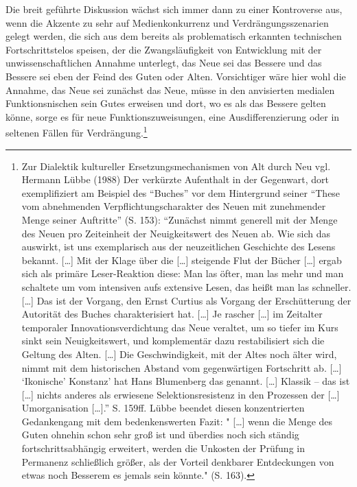 \documentclass[a4paper,
fontsize=11pt,
oneside,
numbers=noperiodatend,
parskip=half-,
bibliography=totoc,
final
]{scrartcl}
\begin{document}
Die breit geführte Diskussion wächst sich immer dann zu einer
Kontroverse aus, wenn die Akzente zu sehr auf Medienkonkurrenz und
Verdrängungsszenarien gelegt werden, die sich aus dem bereits als
problematisch erkannten technischen Fortschrittstelos speisen, der die
Zwangsläufigkeit von Entwicklung mit der unwissenschaftlichen Annahme
unterlegt, das Neue sei das Bessere und das Bessere sei eben der Feind
des Guten oder Alten. Vorsichtiger wäre hier wohl die Annahme, das Neue
sei zunächst das Neue, müsse in den anvisierten medialen
Funktionsnischen sein Gutes erweisen und dort, wo es als das Bessere
gelten könne, sorge es für neue Funktionszuweisungen, eine
Ausdifferenzierung oder in seltenen Fällen für Verdrängung.\footnote{Zur
  Dialektik kultureller Ersetzungsmechanismen von Alt durch Neu vgl.
  Hermann Lübbe (1988) Der verkürzte Aufenthalt in der Gegenwart, dort
  exemplifiziert am Beispiel des \enquote{Buches} vor dem Hintergrund
  seiner \enquote{These vom abnehmenden Verpflichtungscharakter des
  Neuen mit zunehmender Menge seiner Auftritte} (S. 153):
  \enquote{Zunächst nimmt generell mit der Menge des Neuen pro
  Zeiteinheit der Neuigkeitswert des Neuen ab. Wie sich das auswirkt,
  ist uns exemplarisch aus der neuzeitlichen Geschichte des Lesens
  bekannt. {[}\ldots{}{]} Mit der Klage über die {[}\ldots{}{]}
  steigende Flut der Bücher {[}\ldots{}{]} ergab sich als primäre
  Leser-Reaktion diese: Man las öfter, man las mehr und man schaltete um
  vom intensiven aufs extensive Lesen, das heißt man las schneller.
  {[}\ldots{}{]} Das ist der Vorgang, den Ernst Curtius als Vorgang der
  Erschütterung der Autorität des Buches charakterisiert hat.
  {[}\ldots{}{]} Je rascher {[}\ldots{}{]} im Zeitalter temporaler
  Innovationsverdichtung das Neue veraltet, um so tiefer im Kurs sinkt
  sein Neuigkeitswert, und komplementär dazu restabilisiert sich die
  Geltung des Alten. {[}\ldots{}{]} Die Geschwindigkeit, mit der Altes
  noch älter wird, nimmt mit dem historischen Abstand vom gegenwärtigen
  Fortschritt ab. {[}\ldots{}{]} \enquote{Ikonische} Konstanz' hat Hans
  Blumenberg das genannt. {[}\ldots{}{]} Klassik -- das ist
  {[}\ldots{}{]} nichts anderes als erwiesene Selektionsresistenz in den
  Prozessen der {[}\ldots{}{]} Umorganisation {[}\ldots{}{]}.} S. 159ff.
  Lübbe beendet diesen konzentrierten Gedankengang mit dem
  bedenkenswerten Fazit: " {[}\ldots{}{]} wenn die Menge des Guten
  ohnehin schon sehr groß ist und überdies noch sich ständig
  fortschrittsabhängig erweitert, werden die Unkosten der Prüfung in
  Permanenz schließlich größer, als der Vorteil denkbarer Entdeckungen
  von etwas noch Besserem es jemals sein könnte." (S. 163).}
\end{document}

